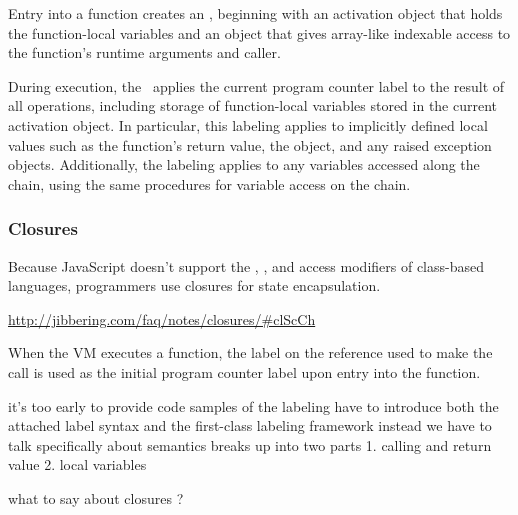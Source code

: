 Entry into a function creates an \cite{ecma}, beginning with an activation object that holds the function-local variables and an  object that gives array-like indexable access to the function's runtime arguments and caller.

\begin{comment}
function foo() {
  console.log(arguments.caller)        // undefined
  console.log(arguments.length)        // length of the argumets
  console.log(Function.caller)         // null
  console.log(foo.caller)              // code of parent function
  console.log(arguments.callee.caller) // code of parent function
  console.log(arguments.callee)        // code of self
  console.log(typeof arguments)        // object
}

foo(1,2,3,4)
\end{comment}


During execution, the \FlowCore\ applies the current program counter label to the result of all operations, including storage of function-local variables stored in the current activation object.
In particular, this labeling applies to implicitly defined local values such as the function's return value, the  object, and any raised exception objects.
Additionally, the labeling applies to any variables accessed along the  chain, using the same procedures for variable access on the  chain.

\subsubsection{Closures}

Because JavaScript doesn't support the , , and  access modifiers of class-based languages, programmers use closures for state encapsulation.

\url{http://jibbering.com/faq/notes/closures/#clScCh}


When the VM executes a function, the label on the reference used to make the call is used as the initial program counter label upon entry into the function.

it's too early to provide code samples of the labeling
  have to introduce both the attached label syntax
  and the first-class labeling framework
instead we have to talk specifically about semantics
  breaks up into two parts
  1. calling and return value
  2. local variables

what to say about closures ?


